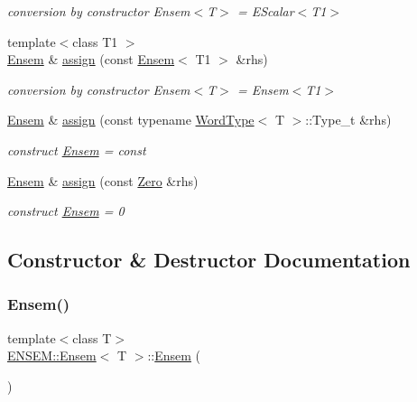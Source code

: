\begin{DoxyCompactItemize}
\begin{DoxyCompactList}\small\item\em conversion by constructor Ensem$<$\+T$>$ = E\+Scalar$<$\+T1$>$ \end{DoxyCompactList}\item 
{\footnotesize template$<$class T1 $>$ }\\\mbox{\hyperlink{classENSEM_1_1Ensem}{Ensem}} \& \mbox{\hyperlink{classENSEM_1_1Ensem_a43d968c090e5f6c518881cf7ff44d200}{assign}} (const \mbox{\hyperlink{classENSEM_1_1Ensem}{Ensem}}$<$ T1 $>$ \&rhs)
\begin{DoxyCompactList}\small\item\em conversion by constructor Ensem$<$\+T$>$ = Ensem$<$\+T1$>$ \end{DoxyCompactList}\item 
\mbox{\hyperlink{classENSEM_1_1Ensem}{Ensem}} \& \mbox{\hyperlink{classENSEM_1_1Ensem_ae31c239c3dc966eaad70ec90489f5476}{assign}} (const typename \mbox{\hyperlink{structENSEM_1_1WordType}{Word\+Type}}$<$ T $>$\+::Type\+\_\+t \&rhs)
\begin{DoxyCompactList}\small\item\em construct \mbox{\hyperlink{classENSEM_1_1Ensem}{Ensem}} = const \end{DoxyCompactList}\item 
\mbox{\hyperlink{classENSEM_1_1Ensem}{Ensem}} \& \mbox{\hyperlink{classENSEM_1_1Ensem_a140d8bb94d07a0abfb2ad396df63c625}{assign}} (const \mbox{\hyperlink{structENSEM_1_1Zero}{Zero}} \&rhs)
\begin{DoxyCompactList}\small\item\em construct \mbox{\hyperlink{classENSEM_1_1Ensem}{Ensem}} = 0 \end{DoxyCompactList}\end{DoxyCompactItemize}


\subsection{Constructor \& Destructor Documentation}
\mbox{\label{classENSEM_1_1Ensem_a8875b85c5536f02d10db536a815984b6}} 
\subsubsection{\texorpdfstring{Ensem()}{Ensem()}\hspace{0.1cm}{\footnotesize\ttfamily [1/6]}}
{\footnotesize\ttfamily template$<$class T$>$ \\
\mbox{\hyperlink{classENSEM_1_1Ensem}{E\+N\+S\+E\+M\+::\+Ensem}}$<$ T $>$\+::\mbox{\hyperlink{classENSEM_1_1Ensem}{Ensem}} (\begin{DoxyParamCaption}{ }\end{DoxyParamCaption})\hspace{0.3cm}{\ttfamily [inline]}}

